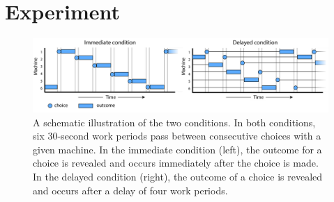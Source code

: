 \documentclass[10pt,letterpaper]{article}
\begin{document}



\section{Experiment}

\begin{figure}[htp]
\centering
\includegraphics[width=\textwidth]{figures/machinetimeline.png}
\caption{A schematic illustration of the two conditions. In both conditions, six
30-second work periods pass between consecutive choices with a given machine. In
the immediate condition (left), the outcome for a choice is revealed and occurs immediately after the
choice is made. In the delayed condition (right), the outcome of a choice is revealed
and occurs after a delay of four work periods.}
\label{fig:machinetimeline}
\end{figure}
\end{document}
